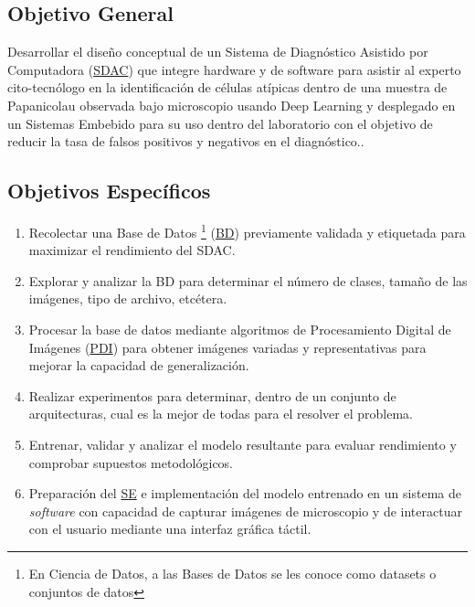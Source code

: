 \subsection{Objetivo General}

Desarrollar el diseño conceptual de un Sistema de Diagnóstico Asistido por
Computadora (\hyperlink{abbr}{SDAC}) que integre hardware y de software para asistir al
experto cito-tecnólogo en la identificación de células atípicas dentro de una
muestra de Papanicolau observada bajo microscopio usando Deep Learning y
desplegado en un Sistemas Embebido para su uso dentro del laboratorio con el
objetivo de reducir la tasa de falsos positivos y negativos en el diagnóstico..

\subsection{Objetivos Específicos}

\begin{enumerate}
    \item Recolectar una Base de Datos \footnote{En Ciencia de Datos, a las Bases de Datos se les conoce como datasets o conjuntos de datos} (\hyperlink{abbr}{BD}) previamente validada y etiquetada para maximizar el rendimiento
    del SDAC.
    \item Explorar y analizar la BD para determinar el número de clases, tamaño
    de las imágenes, tipo de archivo, etcétera. 
    \item Procesar la base de datos mediante algoritmos de Procesamiento Digital
    de Imágenes (\hyperlink{abbr}{PDI}) para obtener imágenes variadas y representativas para mejorar
    la capacidad de generalización.
    \item Realizar experimentos para determinar, dentro de un conjunto de
    arquitecturas, cual es la mejor de todas para el resolver el problema.
    \item Entrenar, validar y analizar el modelo resultante para evaluar
    rendimiento y comprobar supuestos metodológicos.
    \item Preparación del \hyperlink{abbr}{SE} e implementación del modelo
    entrenado en un sistema de \emph{software} con capacidad de capturar
    imágenes de microscopio y de interactuar con el usuario mediante una
    interfaz gráfica táctil.
\end{enumerate}